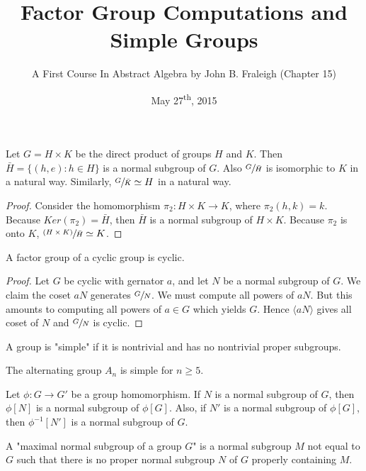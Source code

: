 \documentclass[a4paper,11pt]{article}
\title{Factor Group Computations and Simple Groups}
\author{A First Course In Abstract Algebra by John B. Fraleigh (Chapter 15)}
\date{May 27\textsuperscript{th}, 2015}
\begin{document}
\maketitle
{}

\begin{outline}

    Let \(G = H \times K\) be the direct product of groups \(H\) and \(K\). Then \(\bar{H} = \{(h, e) : h \in H\}\) 
    is a normal subgroup of \(G\). Also \(\sfrac{G}{\bar{H}}\) is isomorphic to \(K\) in a natural way. Similarly, 
    \(\sfrac{G}{\bar{K}} \simeq H\) in a natural way.
    
    \begin{proof}
      Consider the homomorphism \(\pi_{2}: H \times K \rightarrow K\), where \(\pi_{2}(h, k) = k\). Because
      \(Ker(\pi_{2}) = \bar{H}\), then \(\bar{H}\) is a normal subgroup of \(H \times K\). Because 
      \(\pi_{2}\) is onto \(K\), \(\sfrac{(H \times K)}{\bar{H}} \simeq K\).
    \end{proof}

    A factor group of a cyclic group is cyclic.
    
    \begin{proof}
      Let \(G\) be cyclic with gernator \(a\), and let \(N\) be a normal subgroup of \(G\). We claim the coset \(aN\)
      generates \(\sfrac{G}{N}\). We must compute all powers of \(aN\). But this amounts to computing all powers of 
      \(a \in G\) which yields \(G\). Hence \(\langle aN \rangle\) gives all coset of \(N\) and \(\sfrac{G}{N}\) is cyclic.
    \end{proof}
    
    A group is "simple" if it is nontrivial and has no nontrivial proper subgroups.
    
    The alternating group \(A_{n}\) is simple for \(n \geq 5\).
    
    Let \(\phi: G \rightarrow G'\) be a group homomorphism. If \(N\) is a normal subgroup of \(G\), then 
    \(\phi[N]\) is a normal subgroup of \(\phi[G]\). Also, if \(N'\) is a normal subgroup of \(\phi[G]\),
    then \(\phi^{-1}[N']\) is a normal subgroup of \(G\).
    
    A "maximal normal subgroup of a group \(G\)" is a normal subgroup \(M\) not equal to \(G\) such that 
    there is no proper normal subgroup \(N\) of \(G\) properly containing \(M\).
    

\end{outline}
\end{document}
